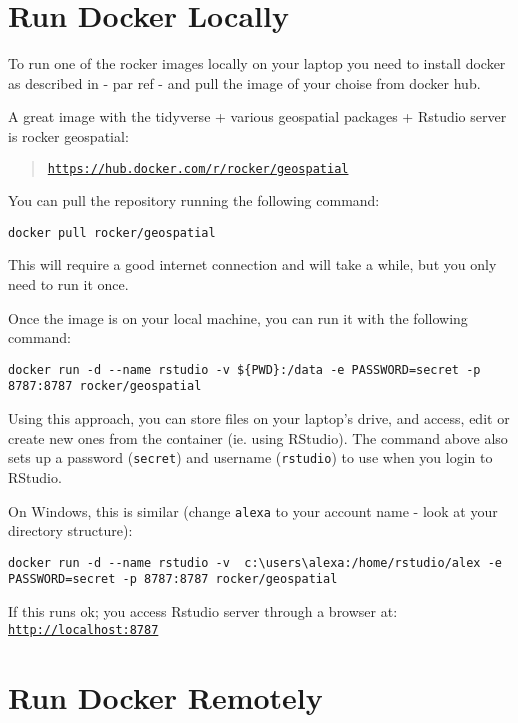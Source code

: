 \documentclass[
]{book}
\begin{document}
\hypertarget{run-docker-locally}{%
\section{Run Docker Locally}\label{run-docker-locally}}

To run one of the rocker images locally on your laptop you need to install docker as described in - par ref - and pull the image of your choise from docker hub.

A great image with the tidyverse + various geospatial packages + Rstudio server is rocker geospatial:

\begin{quote}
\href{https://hub.docker.com/r/rocker/geospatial}{\texttt{https://hub.docker.com/r/rocker/geospatial}}
\end{quote}

You can pull the repository running the following command:

\begin{verbatim}
docker pull rocker/geospatial
\end{verbatim}

This will require a good internet connection and will take a while, but you
only need to run it once.

Once the image is on your local machine, you can run it with the following command:

\begin{verbatim}
docker run -d --name rstudio -v ${PWD}:/data -e PASSWORD=secret -p 8787:8787 rocker/geospatial
\end{verbatim}

Using this approach, you can store files on your laptop's drive, and access, edit or create new ones from the container (ie. using RStudio).
The command above also sets up a password (\texttt{secret}) and username (\texttt{rstudio})
to use when you login to RStudio.

On Windows, this is similar (change \texttt{alexa} to your account name - look at your directory structure):

\begin{verbatim}
docker run -d --name rstudio -v  c:\users\alexa:/home/rstudio/alex -e PASSWORD=secret -p 8787:8787 rocker/geospatial
\end{verbatim}

If this runs ok; you access Rstudio server through a browser at: \href{http://localhost:8787}{\texttt{http://localhost:8787}}

\hypertarget{run-docker-remotely}{%
\section{Run Docker Remotely}\label{run-docker-remotely}}
\end{document}
